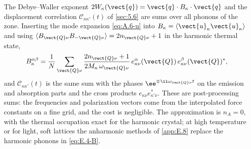 The Debye--Waller exponent $2W_\kappa(\vect{q}) = \vect{q}\cdot B_\kappa\cdot\vect{q}$ and the displacement correlation $\mathcal{C}_{\kappa\kappa'}(t)$ of \cref{sec:5.6} are sums over all phonons of the zone. Inserting the mode expansion \cref{eq:A.6-u} into $B_\kappa = \langle\vect{u}_\kappa\vect{u}_\kappa\rangle$ and using $\langle B_{\vect{Q}\nu}B_{-\vect{Q}\nu}\rangle = 2n_{\vect{Q}\nu} + 1$ in the harmonic thermal state,
\begin{equation}
  B^{\alpha\beta}_\kappa = \frac{1}{N}\sum_{\vect{Q}\nu}\frac{2n_{\vect{Q}\nu} + 1}{2M_\kappa\,\omega_{\vect{Q}\nu}}\,
  e^\alpha_{\kappa\nu}(\vect{Q})\,e^{\beta}_{\kappa\nu}(\vect{Q})^* ,
  \label{eq:E.4-B}
\end{equation}
and $\mathcal{C}_{\kappa\kappa'}(t)$ is the same sum with the phases $\ee^{\mp\ii\omega_{\vect{Q}\nu}t}$ on the emission and absorption parts and the cross products $e_{\kappa\nu}e^*_{\kappa'\nu}$. These are post-processing sums: the frequencies and polarization vectors come from the interpolated force constants on a fine grid, and the cost is negligible. The approximation is $n_A = 0$, with the thermal occupation exact for the harmonic crystal; at high temperature or for light, soft lattices the anharmonic methods of \cref{app:E.8} replace the harmonic phonons in \cref{eq:E.4-B}.

